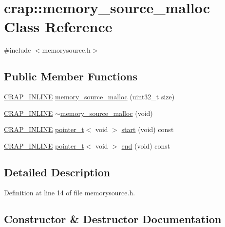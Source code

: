 \hypertarget{classcrap_1_1memory__source__malloc}{}\section{crap\+:\+:memory\+\_\+source\+\_\+malloc Class Reference}
\label{classcrap_1_1memory__source__malloc}


{\ttfamily \#include $<$memorysource.\+h$>$}

\subsection*{Public Member Functions}
\begin{DoxyCompactItemize}
\item 
\hyperlink{config__x86_8h_a5a40526b8d842e7ff731509998bb0f1c}{C\+R\+A\+P\+\_\+\+I\+N\+L\+I\+N\+E} \hyperlink{classcrap_1_1memory__source__malloc_adc6e8b7013733014f95f357168562418}{memory\+\_\+source\+\_\+malloc} (uint32\+\_\+t size)
\item 
\hyperlink{config__x86_8h_a5a40526b8d842e7ff731509998bb0f1c}{C\+R\+A\+P\+\_\+\+I\+N\+L\+I\+N\+E} \hyperlink{classcrap_1_1memory__source__malloc_a909ce07dcf5a78c6b2268b658a82cd23}{$\sim$memory\+\_\+source\+\_\+malloc} (void)
\item 
\hyperlink{config__x86_8h_a5a40526b8d842e7ff731509998bb0f1c}{C\+R\+A\+P\+\_\+\+I\+N\+L\+I\+N\+E} \hyperlink{structcrap_1_1pointer__t}{pointer\+\_\+t}$<$ void $>$ \hyperlink{classcrap_1_1memory__source__malloc_aa1f85681584482adc00fbe059ae36f37}{start} (void) const 
\item 
\hyperlink{config__x86_8h_a5a40526b8d842e7ff731509998bb0f1c}{C\+R\+A\+P\+\_\+\+I\+N\+L\+I\+N\+E} \hyperlink{structcrap_1_1pointer__t}{pointer\+\_\+t}$<$ void $>$ \hyperlink{classcrap_1_1memory__source__malloc_abe5c5d12c09886ad63cefb97a158a579}{end} (void) const 
\end{DoxyCompactItemize}


\subsection{Detailed Description}


Definition at line 14 of file memorysource.\+h.



\subsection{Constructor \& Destructor Documentation}
\hypertarget{classcrap_1_1memory__source__malloc_adc6e8b7013733014f95f357168562418}{}
